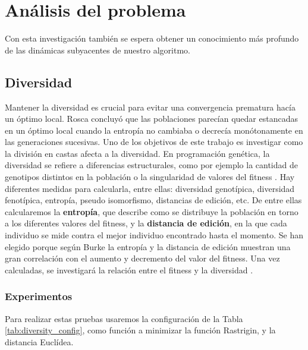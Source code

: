 \chapter{Análisis del problema}

Con esta investigación también se espera obtener
un conocimiento más profundo de las dinámicas subyacentes de nuestro algoritmo. 

\section{Diversidad}

Mantener la diversidad es crucial para evitar una convergencia prematura hacía un óptimo local. Rosca \cite{Rosca} concluyó que las poblaciones parecían quedar estancadas
en un óptimo local cuando la entropía no cambiaba o decrecía monótonamente en las generaciones sucesivas. Uno de los objetivos de este trabajo es investigar como la 
división en castas afecta a la diversidad. En programación genética, la diversidad se refiere a diferencias estructurales, como por ejemplo la cantidad de genotipos 
distintos en la población o la singularidad de valores del fitness \cite{genetic}. Hay diferentes medidas para calcularla, entre ellas: diversidad genotípica, 
diversidad fenotípica, entropía, pseudo isomorfismo, distancias de edición, etc. De entre ellas calcularemos la \textbf{entropía}, que describe como se distribuye la
población en torno a los diferentes valores del fitness, y la \textbf{distancia de edición}, en la que cada individuo se mide contra el mejor individuo encontrado hasta el 
momento. Se han elegido porque según Burke \cite{diversity} la entropía y la distancia de edición muestran una gran correlación con el aumento y decremento del valor 
del fitness. Una vez calculadas, se investigará la relación entre el fitness y la  diversidad \cite{diversity}. 

\subsection{Experimentos}

Para realizar estas pruebas usaremos la configuración de la Tabla \ref{tab:diversity_config}, como función a minimizar la función Rastrigin\cite{BBOB}, y la distancia Euclídea.

